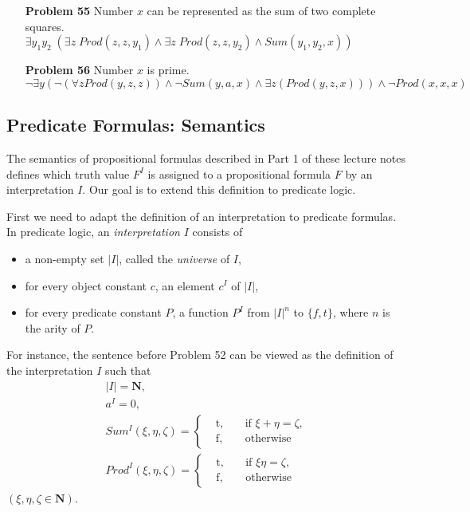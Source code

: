 \begin{enumerate}
\item[\textbf{Problem 55}] Number $x$ can be represented as the sum of two complete squares. \\
$\exists y_1 y_2 \; (\exists z \; Prod(z, z, y_1) \wedge \exists z \; Prod(z, z, y_2) \wedge Sum(y_1, y_2, x))$

\item[\textbf{Problem 56}] Number $x$ is prime. \\
$\neg \exists y (\neg (\forall z Prod(y,z,z)) \wedge \neg Sum(y,a,x) \wedge \exists z (Prod(y, z , x))) \wedge \neg Prod(x, x, x)$
\end{enumerate}

\newpage
\subsection{Predicate Formulas: Semantics}
The semantics of propositional formulas described in Part 1 of these lecture notes defines which truth value $F^I$ is assigned to a propositional formula $F$ by an interpretation $I$. Our goal is to extend this definition to predicate logic.

First we need to adapt the definition of an interpretation to predicate formulas. In predicate logic, an \textit{interpretation} $I$ consists of
\begin{itemize}
\item a non-empty set $|I|$, called the \textit{universe} of $I$,  
\item for every object constant $c$, an element $c^I$ of $|I|$, 
\item for every predicate constant $P$, a function $P^I$ from $|I|^n$ to $\{f, t\}$, where $n$ is the arity of $P$. 
\end{itemize}

For instance, the sentence before Problem 52 can be viewed as the definition of the interpretation $I$ such that
\begin{equation}
\label{inter1}
\begin{gathered}
|I| = \mathbf{N}, \\
a^I = 0, \\
Sum^I(\xi, \eta, \zeta) = 
\left\{
        \begin{array}{ccc}      
        &\mathrm{t}, \quad &\text{if }  \xi + \eta = \zeta, \\
        &\mathrm{f}, \quad &\text{otherwise}
        \end{array}\right. \\
Prod^I(\xi, \eta, \zeta) = 
\left\{
        \begin{array}{ccc}      
        &\mathrm{t}, \quad &\text{if }  \xi \eta = \zeta, \\
        &\mathrm{f}, \quad &\text{otherwise}
        \end{array}\right.       
\end{gathered}
\end{equation}
$(\xi, \eta, \zeta \in \mathbf{N})$. 

